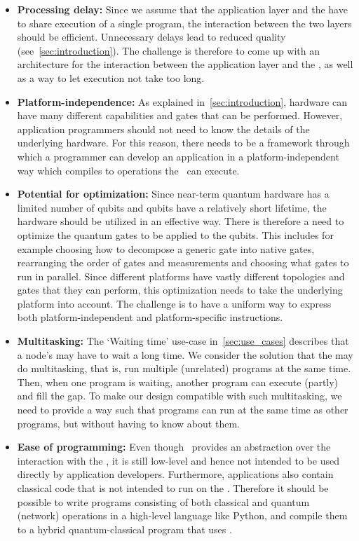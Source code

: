 \begin{itemize}
      \item \label{item:design_proc_delay}\textbf{Processing delay:}
            Since we assume that the application layer and the \QNPU have to share execution of a single program, the interaction between the two layers should be efficient.
            Unnecessary delays lead to reduced quality (see~\cref{sec:introduction}).
            The challenge is therefore to come up with an architecture for the interaction between the application layer and the \QNPU, as well as a way to let \QNPU execution not take too long.
      \item \label{item:design_pi} \textbf{Platform-independence:}
            As explained in~\cref{sec:introduction}, hardware can have many different capabilities and gates that can be performed.
            However, application programmers should not need to know the details of the underlying hardware.
            For this reason, there needs to be a framework through which a programmer can develop an application in a platform-independent way which compiles to operations the \QNPU\ can execute.
      \item \label{item:design_opt} \textbf{Potential for optimization:}
            Since near-term quantum hardware has a limited number of qubits and qubits have a relatively short lifetime, the hardware should be utilized in an effective way.
            There is therefore a need to optimize the quantum gates to be applied to the qubits.
            This includes for example choosing how to decompose a generic gate into native gates, rearranging the order of gates and measurements and choosing what gates to run in parallel.
            Since different platforms have vastly different topologies and gates that they can perform, this optimization needs to take the underlying platform into account.
            The challenge is to have a uniform way to express both platform-independent and platform-specific instructions.
      \item \label{item:design_parallel} \textbf{Multitasking:}
            The `Waiting time' use-case in~\cref{sec:use_cases} describes that a node's \QNPU may have to wait a long time. We consider the solution that the \QNPU may do multitasking, that is, run multiple (unrelated) programs at the same time.
            Then, when one program is waiting, another program can execute (partly) and fill the gap.
            To make our design compatible with such multitasking, we need to provide a way such that programs can run at the same time as other programs, but without having to know about them.
      \item \label{item:ease_programming} \textbf{Ease of programming:}
            Even though \netqasm\ provides an abstraction over the interaction with the \QNPU, it is still low-level and hence not intended to be used directly by application developers.
            Furthermore, applications also contain classical code that is not intended to run on the \QNPU.
            Therefore it should be possible to write programs consisting of both classical and quantum (network) operations in a high-level language like Python, and compile them to a hybrid quantum-classical program that uses \netqasm.


\end{itemize}
